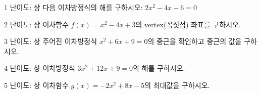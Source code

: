 \documentclass[fleqn]{article}
\begin{document}
   
1 난이도: 상 다음 이차방정식의 해를 구하시오: \(2x^2 - 4x - 6 = 0\)

2 난이도: 상 이차함수 \(f(x) = x^2 - 4x + 3\)의 vertex(꼭짓점) 좌표를
구하시오.

3 난이도: 상 주어진 이차방정식 \(x^2 + 6x + 9 = 0\)의 중근을 확인하고
중근의 값을 구하시오.

4 난이도: 상 이차방정식 \(3x^2 + 12x + 9 = 0\)의 해를 구하시오.

5 난이도: 상 이차함수 \(g(x) = -2x^2 + 8x - 5\)의 최대값을 구하시오.
\end{document}
